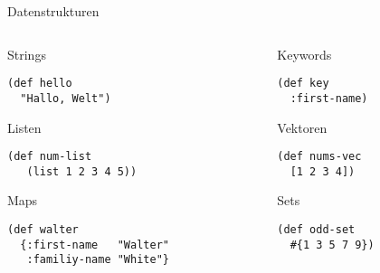 \documentclass[presentation]{beamer}
\begin{document}
\begin{frame}[fragile]{Datenstrukturen}
  \begin{columns}
    \begin{column}{0.5\textwidth}
      \begin{block}{Strings}
\begin{verbatim}
(def hello
  "Hallo, Welt")
\end{verbatim}
      \end{block}
      \begin{block}{Listen}
\begin{verbatim}
(def num-list
   (list 1 2 3 4 5))
\end{verbatim}
      \end{block}
      \begin{block}{Maps}
\begin{verbatim}
(def walter
  {:first-name   "Walter"
   :familiy-name "White"}
\end{verbatim}
      \end{block}
    \end{column}
    \begin{column}{0.5\textwidth}
      \begin{block}{Keywords}
\begin{verbatim}
(def key
  :first-name)
\end{verbatim}
      \end{block}
      \begin{block}{Vektoren}
\begin{verbatim}
(def nums-vec
  [1 2 3 4])
\end{verbatim}
      \end{block}
      \begin{block}{Sets}
\begin{verbatim}
(def odd-set
  #{1 3 5 7 9})
\end{verbatim}
      \end{block}
    \end{column}
  \end{columns}
\end{frame}
\end{document}
